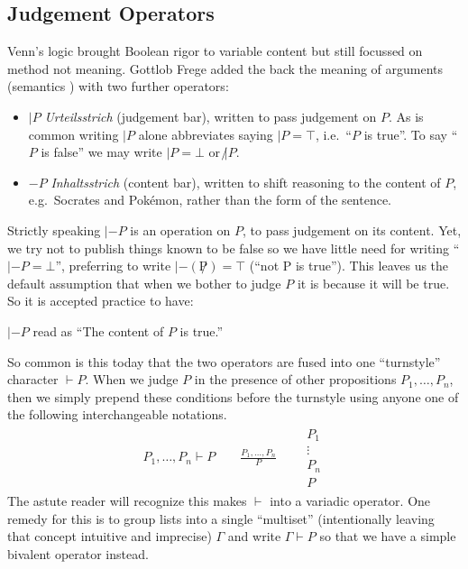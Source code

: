 \subsection{Judgement Operators}
Venn's logic brought Boolean rigor to variable content but still focussed 
on method not meaning.  Gottlob Frege added the back the meaning of arguments
(semantics ) with two further operators:
\begin{itemize}
    \item $|P$ \emph{Urteilsstrich} (judgement bar), written to pass judgement 
    on $P$.  As is common writing $|P$ alone abbreviates saying $|P=\top$, i.e.\
     ``$P$ is true''.  To say ``$P$ is false'' we may write $|P=\bot$ or $\not| P$.

    \item $-P$ \emph{Inhaltsstrich} (content bar), written to shift reasoning 
    to the content of $P$, e.g.\ Socrates and Pok\'emon, rather than the 
    form of the sentence.
\end{itemize}
Strictly speaking $|-P$ is an operation on $P$, to pass judgement on its content.
Yet, we try not to publish things known to be false so we have little need for 
writing ``$|-P=\bot$'', preferring to write $|- (\not P)=\top$ (``not P is true'').
This leaves us the default assumption that when we bother to 
judge $P$ it is because it will be true.  So it is accepted practice to have:
\begin{center}
    $|-P$ read as ``The content of $P$ is true.'' 
\end{center}
So common is this today that the two operators are fused into one
``turnstyle'' character $\vdash P$.  When we judge $P$ in the presence of 
other propositions $P_1,\ldots, P_n$, then we simply prepend these conditions before the turnstyle 
using anyone one of the following interchangeable notations.
\begin{gather*}
    P_1,\ldots,P_n\vdash P 
    \qquad 
    \frac{P_1,\ldots,P_n}{P}
    \qquad 
    \begin{array}{c}
        P_1\\ \vdots \\ P_n\\ \hline P 
    \end{array}
\end{gather*}
The astute reader will recognize this makes $\vdash$ into a variadic operator.
One remedy for this is to group lists into a single ``multiset'' (intentionally leaving 
that concept intuitive and imprecise) $\Gamma$ and write $\Gamma\vdash P$ so that we have a 
simple bivalent operator instead.

